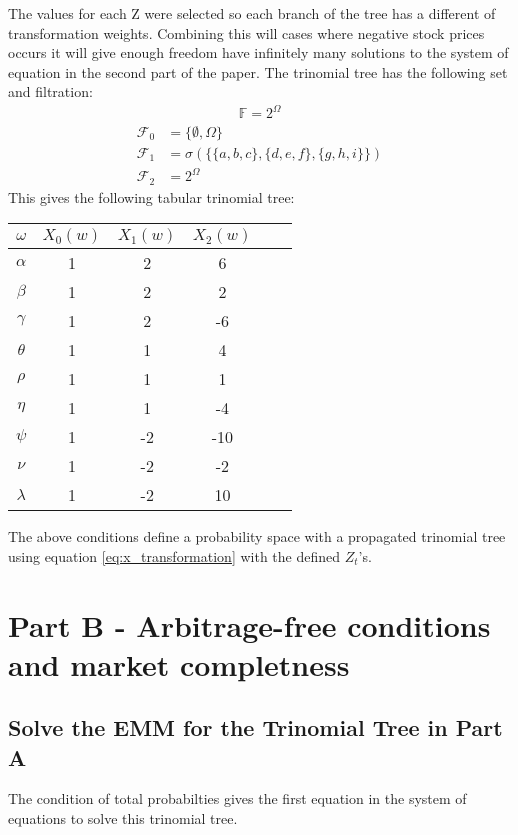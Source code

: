\documentclass{article}
\begin{document}
The values for each Z were selected so each branch of the tree has a different of transformation weights. Combining this will cases where negative stock prices occurs it will give enough freedom have infinitely many solutions to the system of equation in the second part of the paper. The trinomial tree has the following set and filtration:
\begin{align*}
    \mathbb{F} = 2^\Omega
\end{align*}
\begin{align*}
    \mathcal{F}_0 &= \{\emptyset,\Omega\} \\
    \mathcal{F}_1 &= \sigma(\{\{a,b,c\},\{d,e,f\},\{g,h,i\}\}) \\
    \mathcal{F}_2 &= 2^\Omega
\end{align*}
This gives the following tabular trinomial tree:
\begin{center}
\begin{tabular}{|c|c|c|c|c|c|}
\hline
$\omega$ & $X_0(w)$ & $X_1(w)$ & $X_2(w)$ \\
\hline
\hline
$\alpha$ & 1 & 2 & 6 \\\hline
$\beta$ & 1 & 2 & 2 \\\hline
$\gamma$ & 1 & 2 & -6 \\\hline
$\theta$ & 1 & 1 & 4 \\\hline
$\rho$ & 1 & 1 & 1 \\\hline
$\eta$ & 1 & 1 & -4 \\\hline
$\psi$ & 1 & -2 & -10 \\\hline
$\nu$ & 1 & -2 & -2 \\\hline
$\lambda$ & 1 & -2 & 10 \\\hline
\end{tabular}
\end{center}

The above conditions define a probability space with a propagated trinomial tree using equation \ref{eq:x_transformation} with the defined $Z_t$'s.

\section{Part B - Arbitrage-free conditions and market completness}

\subsection{Solve the EMM for the Trinomial Tree in Part A}

The condition of total probabilties gives the first equation in the system of equations to solve this trinomial tree.
\end{document}
